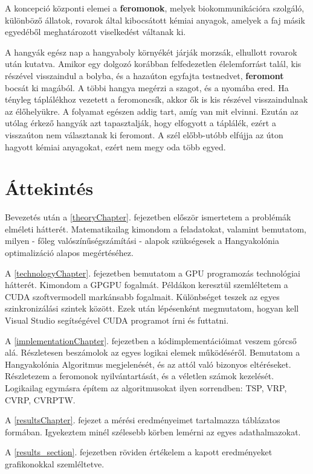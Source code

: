 A koncepció központi elemei a \textbf{feromonok}, melyek biokommunikációra szolgáló, különböző állatok, rovarok által kibocsátott kémiai anyagok, amelyek a faj másik egyedéből meghatározott viselkedést váltanak ki.

A hangyák egész nap a hangyaboly környékét járják morzsák, elhullott rovarok után kutatva. Amikor egy dolgozó korábban felfedezetlen élelemforrást talál, kis részével visszaindul a bolyba, és a hazaúton egyfajta testnedvet, \textbf{feromont} bocsát ki magából. A többi hangya megérzi a szagot, és a nyomába ered. Ha tényleg táplálékhoz vezetett a feromoncsík, akkor ők is kis részével visszaindulnak az élőhelyükre. A folyamat egészen addig tart, amíg van mit elvinni. Ezután az utólag érkező hangyák azt tapasztalják, hogy elfogyott a táplálék, ezért a visszaúton nem választanak ki feromont. A szél előbb-utóbb elfújja az úton hagyott kémiai anyagokat, ezért nem megy oda több egyed.

\section{Áttekintés}
Bevezetés után a \ref{theoryChapter}. fejezetben először ismertetem a problémák elméleti hátterét. Matematikailag kimondom a feladatokat, valamint bemutatom, milyen - főleg valószínűségszámítási - alapok szükségesek a Hangyakolónia optimalizáció alapos megértéséhez.

A \ref{technologyChapter}. fejezetben bemutatom a GPU programozás technológiai hátterét. Kimondom a GPGPU fogalmát. Példákon keresztül szemléltetem a CUDA szoftvermodell markánsabb fogalmait. Különbséget teszek az egyes szinkronizálási szintek között. Ezek után lépésenként megmutatom, hogyan kell Visual Studio segítségével CUDA programot írni és futtatni.

A \ref{implementationChapter}. fejezetben a kódimplementációimat veszem górcső alá. Részletesen beszámolok az egyes logikai elemek működéséről. Bemutatom a Hangyakolónia Algoritmus megjelenését, és az attól való bizonyos eltéréseket. Részletezem a feromonok nyilvántartását, és a véletlen számok kezelését. Logikailag egymásra építem az algoritmusokat ilyen sorrendben: TSP, VRP, CVRP, CVRPTW.

A \ref{resultsChapter}. fejezet a mérési eredményeimet tartalmazza táblázatos formában. Igyekeztem minél szélesebb körben lemérni az egyes adathalmazokat. 

A \ref{results_section}. fejezetben röviden értékelem a kapott eredményeket grafikonokkal szemléltetve. 


